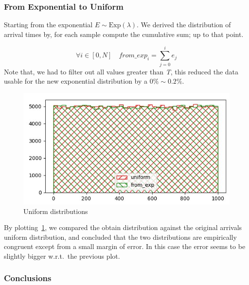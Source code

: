 \documentclass[10pt,a4paper]{article}
\begin{document}
\subsubsection*{From Exponential to Uniform}

Starting from the exponential \(E\sim\text{Exp}(\lambda)\). We derived the distribution of arrival times by, for each sample compute the cumulative sum; up to that point.

\begin{equation*}
  \forall i\in[0,N]\quad from\_exp_{i} =\sum_{j=0}^{i}{e_{j}}
\end{equation*}
Note that, we had to filter out all values greater than \emph{T}, this reduced the data usable for the new exponential distribution by a \(0\%\sim0.2\%\). %

\begin{figure}[h]
  \centering
  \includegraphics[scale=0.5]{es1-2.png}
  \caption{Uniform distributions}
  \label{fig:2}
\end{figure}

By plotting~\ref{fig:2}, we compared the obtain distribution against the original arrivals uniform distribution, and concluded that the two distributions are empirically congruent except from a small margin of error. In this case the error seems to be slightly bigger w.r.t.\ the previous plot.

\subsubsection*{Conclusions}

\end{document}
